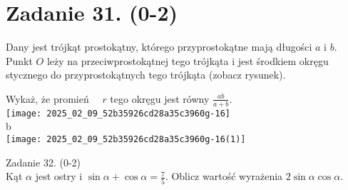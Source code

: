 \documentclass[10pt]{article}
\begin{document}
\section*{Zadanie 31. (0-2)}
Dany jest trójkąt prostokątny, którego przyprostokątne mają długości \(a\) i \(b\). Punkt \(O\) leży na przeciwprostokątnej tego trójkąta i jest środkiem okręgu stycznego do przyprostokątnych tego trójkąta (zobacz rysunek).

Wykaż, że promień \(\quad r\) tego okręgu jest równy \(\frac{a b}{a+b}\).\\
\texttt{[image: 2025\_02\_09\_52b35926cd28a35c3960g-16]}\\
b\\
\texttt{[image: 2025\_02\_09\_52b35926cd28a35c3960g-16(1)]}

Zadanie 32. (0-2)\\
Kąt \(\alpha\) jest ostry i \(\sin \alpha+\cos \alpha=\frac{7}{5}\). Oblicz wartość wyrażenia \(2 \sin \alpha \cos \alpha\).
\end{document}
